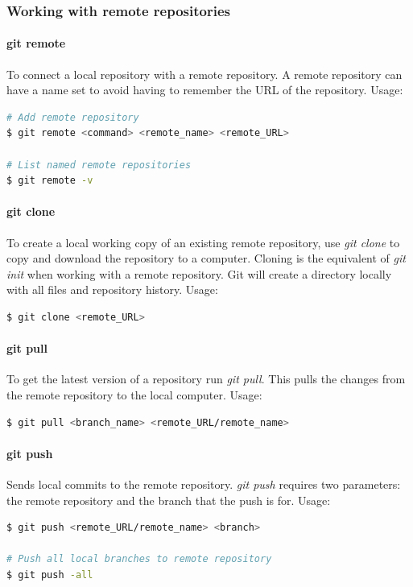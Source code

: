 \documentclass[a4paper]{report}
\begin{document}
\subsubsection{Working with remote repositories}
\paragraph{git remote}
To connect a local repository with a remote repository. A remote repository can have a name set to avoid having to remember the URL of the repository.
Usage:
\begin{lstlisting}[language=bash]
# Add remote repository
$ git remote <command> <remote_name> <remote_URL>

# List named remote repositories
$ git remote -v
\end{lstlisting}

\paragraph{git clone}
To create a local working copy of an existing remote repository, use \emph{git clone} to copy and download the repository to a computer. Cloning is the equivalent of \emph{git init} when working with a remote repository. Git will create a directory locally with all files and repository history.
Usage:
\begin{lstlisting}[language=bash]
$ git clone <remote_URL>
\end{lstlisting}

\paragraph{git pull}
To get the latest version of a repository run \emph{git pull}. This pulls the changes from the remote repository to the local computer.
Usage:
\begin{lstlisting}[language=bash]
$ git pull <branch_name> <remote_URL/remote_name>
\end{lstlisting}


\paragraph{git push}
Sends local commits to the remote repository. \emph{git push} requires two parameters: the remote repository and the branch that the push is for.
Usage:
\begin{lstlisting}[language=bash]
$ git push <remote_URL/remote_name> <branch>

# Push all local branches to remote repository
$ git push -all
\end{lstlisting}
\end{document}

